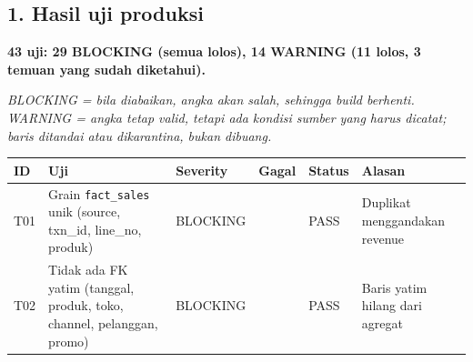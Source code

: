 \documentclass[10pt,a4paper]{article}
\begin{document}
\subsection{1. Hasil uji produksi}\label{hasil-uji-produksi}

\textbf{43 uji: 29 BLOCKING (semua lolos), 14 WARNING (11 lolos, 3 temuan yang sudah diketahui).}

\emph{BLOCKING = bila diabaikan, angka akan salah, sehingga build berhenti. WARNING = angka tetap valid, tetapi ada kondisi sumber yang harus dicatat; baris ditandai atau dikarantina, bukan dibuang.}

{\def\LTcaptype{none} %
\begin{longtable}[]{@{}
  >{\raggedright\arraybackslash}p{}
  >{\raggedright\arraybackslash}p{}
  >{\raggedright\arraybackslash}p{}
  >{\raggedleft\arraybackslash}p{}
  >{\raggedright\arraybackslash}p{}
  >{\raggedright\arraybackslash}p{}@{}}
\toprule\noalign{}
\begin{minipage}[b]{\linewidth}\raggedright
ID
\end{minipage} & \begin{minipage}[b]{\linewidth}\raggedright
Uji
\end{minipage} & \begin{minipage}[b]{\linewidth}\raggedright
Severity
\end{minipage} & \begin{minipage}[b]{\linewidth}\raggedleft
Gagal
\end{minipage} & \begin{minipage}[b]{\linewidth}\raggedright
Status
\end{minipage} & \begin{minipage}[b]{\linewidth}\raggedright
Alasan
\end{minipage} \\
\midrule\noalign{}
\endhead
\bottomrule\noalign{}
\endlastfoot
T01 & Grain \texttt{fact\_\allowbreak{}sales} unik (source, txn\_\allowbreak{}id, line\_\allowbreak{}no, produk) & BLOCKING & 0 & PASS & Duplikat menggandakan revenue \\
T02 & Tidak ada FK yatim (tanggal, produk, toko, channel, pelanggan, promo) & BLOCKING & 0 & PASS & Baris yatim hilang dari agregat \\

\end{longtable}}
\end{document}
